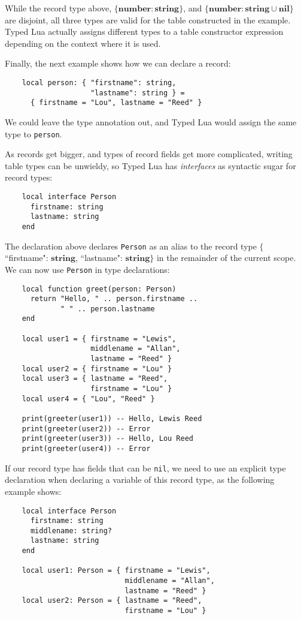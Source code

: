 \documentclass[preprint]{sig-alternate}
\newcommand{\Nil}{\mathbf{nil}}
\newcommand{\Number}{\mathbf{number}}
\newcommand{\String}{\mathbf{string}}
\begin{document}
While the record type above, $\{\Number:\String\}$, and
$\{\Number: \String\cup\Nil\}$ are disjoint, all three
types are valid for the table constructed in the example.
Typed Lua actually assigns different types to a table constructor
expression depending on the context where it is used.

Finally, the next example shows how we can declare a record:

\begin{verbatim}
    local person: { "firstname": string,
                    "lastname": string } =
      { firstname = "Lou", lastname = "Reed" } 
\end{verbatim}

We could leave the type annotation out, and Typed Lua would
assign the same type to {\tt person}.

As records get bigger, and types of record fields get more
complicated, writing table types can be unwieldy, so Typed
Lua has {\em interfaces} as syntactic sugar for record types:

\begin{verbatim}
    local interface Person
      firstname: string
      lastname: string
    end
\end{verbatim}

The declaration above declares {\tt Person} as an alias to
the record type $\{$``firstname": $\String$,
 ``lastname": $\String\}$ in
the remainder of the current scope. We can now use {\tt Person} in
type declarations:

\begin{verbatim}
    local function greet(person: Person)
      return "Hello, " .. person.firstname ..
             " " .. person.lastname
    end

    local user1 = { firstname = "Lewis",
                    middlename = "Allan",
                    lastname = "Reed" }
    local user2 = { firstname = "Lou" }
    local user3 = { lastname = "Reed",
                    firstname = "Lou" }
    local user4 = { "Lou", "Reed" }

    print(greeter(user1)) -- Hello, Lewis Reed
    print(greeter(user2)) -- Error
    print(greeter(user3)) -- Hello, Lou Reed
    print(greeter(user4)) -- Error
\end{verbatim}

If our record type has fields that can be {\tt nil}, we need
to use an explicit type declaration when declaring a
variable of this record type, as the following example shows:

\begin{verbatim}
    local interface Person
      firstname: string
      middlename: string?
      lastname: string
    end

    local user1: Person = { firstname = "Lewis",
                            middlename = "Allan",
                            lastname = "Reed" }
    local user2: Person = { lastname = "Reed",
                            firstname = "Lou" }
\end{verbatim}
\end{document}
